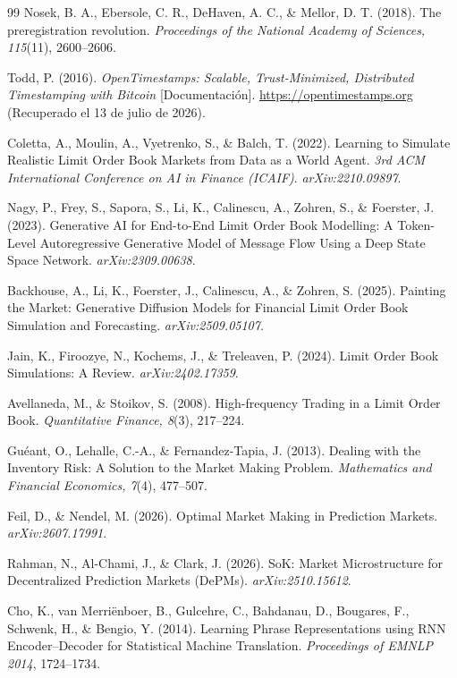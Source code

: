 \begin{thebibliography}{99}
Nosek, B. A., Ebersole, C. R., DeHaven, A. C., \& Mellor, D. T. (2018). The
preregistration revolution. \textit{Proceedings of the National Academy of Sciences,
115}(11), 2600--2606.

Todd, P. (2016). \textit{OpenTimestamps: Scalable, Trust-Minimized, Distributed
Timestamping with Bitcoin} [Documentación]. \url{https://opentimestamps.org}
(Recuperado el 13 de julio de 2026).

Coletta, A., Moulin, A., Vyetrenko, S., \& Balch, T. (2022). Learning to Simulate
Realistic Limit Order Book Markets from Data as a World Agent. \textit{3rd ACM
International Conference on AI in Finance (ICAIF)}. \textit{arXiv:2210.09897}.

Nagy, P., Frey, S., Sapora, S., Li, K., Calinescu, A., Zohren, S., \& Foerster, J.
(2023). Generative AI for End-to-End Limit Order Book Modelling: A Token-Level
Autoregressive Generative Model of Message Flow Using a Deep State Space Network.
\textit{arXiv:2309.00638}.

Backhouse, A., Li, K., Foerster, J., Calinescu, A., \& Zohren, S. (2025). Painting the
Market: Generative Diffusion Models for Financial Limit Order Book Simulation and
Forecasting. \textit{arXiv:2509.05107}.

Jain, K., Firoozye, N., Kochems, J., \& Treleaven, P. (2024). Limit Order Book
Simulations: A Review. \textit{arXiv:2402.17359}.

Avellaneda, M., \& Stoikov, S. (2008). High-frequency Trading in a Limit Order Book.
\textit{Quantitative Finance, 8}(3), 217--224.

Guéant, O., Lehalle, C.-A., \& Fernandez-Tapia, J. (2013). Dealing with the Inventory
Risk: A Solution to the Market Making Problem. \textit{Mathematics and Financial
Economics, 7}(4), 477--507.

Feil, D., \& Nendel, M. (2026). Optimal Market Making in Prediction Markets.
\textit{arXiv:2607.17991}.

Rahman, N., Al-Chami, J., \& Clark, J. (2026). SoK: Market Microstructure for
Decentralized Prediction Markets (DePMs). \textit{arXiv:2510.15612}.

Cho, K., van Merri\"enboer, B., Gulcehre, C., Bahdanau, D., Bougares, F., Schwenk, H.,
\& Bengio, Y. (2014). Learning Phrase Representations using RNN Encoder--Decoder for
Statistical Machine Translation. \textit{Proceedings of EMNLP 2014}, 1724--1734.


\end{thebibliography}
